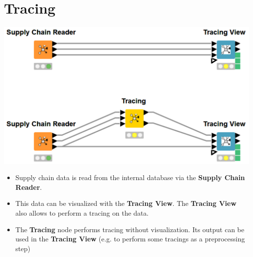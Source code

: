 \documentclass{beamer}
\begin{document}
\section{Tracing}
\begin{frame}
	\begin{center}
  		\includegraphics[height=0.4\textheight]{2.png}
	\end{center}
	\begin{itemize}
		\item Supply chain data is read from the internal database via the \textbf{Supply Chain Reader}.
		\item This data can be visualized with the \textbf{Tracing View}. The \textbf{Tracing View} also allows to perform a tracing on the data.
		\item The \textbf{Tracing} node performs tracing without visualization. Its output can be used in the \textbf{Tracing View} (e.g. to perform some tracings as a preprocessing step)
	\end{itemize}
\end{frame}
\end{document}
